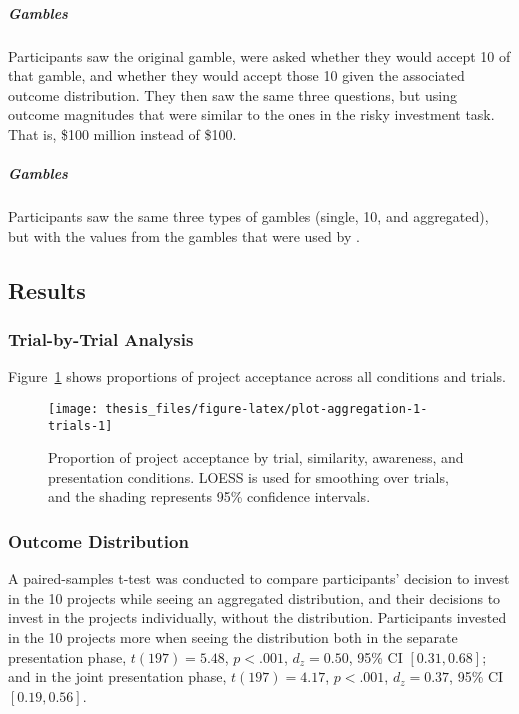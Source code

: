 \documentclass[a4paper, nobind]{templates/ociamthesis}
\theoremstyle{definition}
\theoremstyle{definition}
\theoremstyle{definition}
\theoremstyle{definition}
\theoremstyle{remark}
\begin{document}
\subparagraph{\texorpdfstring{\textcite{samuelson1963} Gambles}{Samuelson (1963) Gambles}}

Participants saw the original \textcite{samuelson1963} gamble, were asked whether they
would accept 10 of that gamble, and whether they would accept those 10 given the
associated outcome distribution. They then saw the same three questions, but
using outcome magnitudes that were similar to the ones in the risky investment
task. That is, \$100 million instead of \$100.

\subparagraph{\texorpdfstring{\textcite{redelmeier1992} Gambles}{Redelmeier \& Tversky (1992) Gambles}}

Participants saw the same three types of gambles (single, 10, and aggregated),
but with the values from the gambles that were used by \textcite{redelmeier1992}.

\hypertarget{results-aggregation-1-appendix}{%
\subsection{Results}\label{results-aggregation-1-appendix}}

\hypertarget{trial-by-trial-aggregation-1}{%
\subsubsection{Trial-by-Trial Analysis}\label{trial-by-trial-aggregation-1}}

Figure~\ref{fig:plot-aggregation-1-trials} shows proportions of project
acceptance across all conditions and trials.



\begin{figure}
\texttt{[image: thesis\_files/figure-latex/plot-aggregation-1-trials-1]} \caption{Proportion of project acceptance by trial, similarity, awareness, and presentation conditions. LOESS is used for smoothing over trials, and the shading represents 95\% confidence intervals.}\label{fig:plot-aggregation-1-trials}
\end{figure}

\hypertarget{outcome-distribution-aggregation-1}{%
\subsubsection{Outcome Distribution}\label{outcome-distribution-aggregation-1}}

A paired-samples t-test was conducted to compare participants' decision to
invest in the 10 projects while seeing an aggregated distribution, and their
decisions to invest in the projects individually, without the distribution.
Participants invested in the 10 projects more when seeing the distribution both
in the separate presentation phase,
\(t(197) = 5.48\), \(p < .001\), \(d_z = 0.50\), 95\% CI \([0.31, 0.68]\); and in the joint
presentation phase, \(t(197) = 4.17\), \(p < .001\), \(d_z = 0.37\), 95\% CI \([0.19, 0.56]\).
\end{document}
